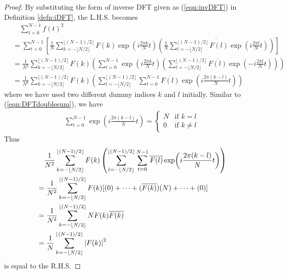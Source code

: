 \begin{proof}
By substituting the form of inverse DFT given as (\ref{eqn:invDFT}) in Definition \ref{defn:iDFT}, the L.H.S. becomes 
\begin{align*}
&\quad \sum_{t=0}^{N-1} f(t)^2 \\
&= \sum_{t=0}^{N-1} \left[ \frac{1}{N} \sum_{k= -\lfloor N/2 \rfloor}^{\lfloor (N-1)/2 \rfloor} F(k)\exp(i\frac{2\pi k}{N}t) \left( \overline{ \frac{1}{N}\sum_{l= -\lfloor N/2 \rfloor}^{\lfloor (N-1)/2 \rfloor} F(l)\exp(i\frac{2\pi l}{N}t)} \right) \right] \\
&= \frac{1}{N^2}\sum_{k= -\lfloor N/2 \rfloor}^{\lfloor (N-1)/2 \rfloor} F(k) \left(\sum_{t=0}^{N-1} \exp(i\frac{2\pi k}{N}t) \left( \sum_{l= -\lfloor N/2 \rfloor}^{\lfloor (N-1)/2 \rfloor} \overline{F(l)}\exp(-i\frac{2\pi l}{N}t) \right) \right) \\
&= \frac{1}{N^2} \sum_{k= -\lfloor N/2 \rfloor}^{\lfloor (N-1)/2 \rfloor} F(k) \left( \sum_{l= -\lfloor N/2 \rfloor}^{\lfloor (N-1)/2 \rfloor}  \sum_{t=0}^{N-1} \overline{F(l)}\exp(i \frac{2\pi (k-l)}{N}t) \right) 
\end{align*}
where we have used two different dummy indices $k$ and $l$ initially. Similar to (\ref{eqn:DFTdoublesum}), we have
\begin{align}
\sum_{t=0}^{N-1} \exp(i \frac{2\pi (k-l)}{N}t) = 
\begin{cases}
N & \text{if $k = l$} \\
0 & \text{if $k \neq l$}
\end{cases}     
\end{align}
Thus
\begin{align*}
&\quad \frac{1}{N^2}  \sum_{k= -\lfloor N/2 \rfloor}^{\lfloor (N-1)/2 \rfloor} F(k) \left( \sum_{l= -\lfloor N/2 \rfloor}^{\lfloor (N-1)/2 \rfloor}  \sum_{t=0}^{N-1} \overline{F(l)}\exp(i \frac{2\pi (k-l)}{N}t) \right) \\
&= \frac{1}{N^2}  \sum_{k= -\lfloor N/2 \rfloor}^{\lfloor (N-1)/2 \rfloor} F(k) [(0) + \cdots + (\overline{F(k)})(N) + \cdots + (0)] \\
&= \frac{1}{N^2}  \sum_{k= -\lfloor N/2 \rfloor}^{\lfloor (N-1)/2 \rfloor} N F(k)\overline{F(k)} \\
&= \frac{1}{N} \sum_{k= -\lfloor N/2 \rfloor}^{\lfloor (N-1)/2 \rfloor} \abs{F(k)}^2
\end{align*} 
is equal to the R.H.S.
\end{proof}

